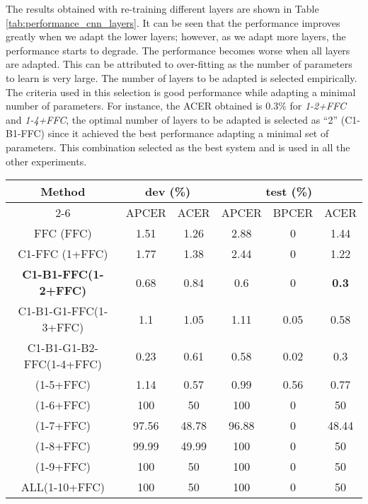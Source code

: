 \documentclass[journal]{IEEEtran}
\begin{document}
The results obtained with re-training different layers are shown in Table \ref{tab:performance_cnn_layers}. 
It can be seen that the performance improves greatly when we adapt the lower layers; however, as we adapt more layers, the performance starts to degrade. The performance becomes worse when all layers are adapted. This can be attributed to over-fitting as the number of parameters to learn is very large. The number of layers to be adapted is selected empirically. The criteria used in this selection is good performance while adapting a minimal number of parameters. For instance, the ACER obtained is 0.3\% for \textit{1-2+FFC} and \textit{1-4+FFC}, the optimal number of layers to be adapted is selected as ``2'' (C1-B1-FFC) since it achieved the best performance adapting a minimal set of parameters. This combination selected as the best system and is used in all the other experiments. 


\begin{table*}[t]
\centering
\caption{Performance of the MC-CNN when different combinations of layers were adapted.}
\label{tab:performance_cnn_layers}
\begin{tabular}{@{}ccc|ccc@{}}
\toprule
\multirow{2}{*}{Method} & \multicolumn{2}{c|}{dev (\%)}     & \multicolumn{3}{c}{test (\%)}                                  \\ \cmidrule(l){2-6}
                        & \multicolumn{1}{c|}{APCER} & ACER & \multicolumn{1}{c|}{APCER} & \multicolumn{1}{c|}{BPCER} & ACER  \\ \midrule
FFC (FFC)               &1.51   &1.26  & 2.88  &   0  &1.44 \\
C1-FFC (1+FFC)          &1.77   &1.38  & 2.44  &   0  &1.22 \\
\textbf{C1-B1-FFC(1-2+FFC)}        &0.68   &0.84  &  0.6  &   0  &\textbf{0.3} \\
C1-B1-G1-FFC(1-3+FFC)     &1.1    &1.05  & 1.11  &  0.05  &0.58 \\
C1-B1-G1-B2-FFC(1-4+FFC)  &0.23   &0.61  & 0.58  &  0.02  &0.3 \\
(1-5+FFC)                 &1.14   &0.57  & 0.99  &  0.56  &0.77 \\
(1-6+FFC)                 &100    &50    & 100   &  0   &50 \\
(1-7+FFC)                 &97.56  &48.78 &  96.88&  0   &48.44 \\
(1-8+FFC)                 &99.99  &49.99 & 100 &  0   &50 \\
(1-9+FFC)                 &100    &50    &100    &  0   &50 \\
ALL(1-10+FFC)             &100    &50    &100    &  0   &50 \\ \bottomrule
\end{tabular}
\end{table*}
\end{document}
